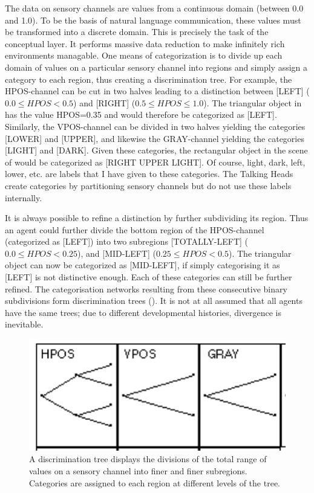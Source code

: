 The data on sensory channels are values from a continuous domain
(between 0.0 and 1.0). 
To be the basis of natural language communication, these
values must be transformed into a discrete domain. This is 
precisely the task of the conceptual layer. It 
performs massive data reduction to make infinitely
rich environments managable. One means of categorization
is to divide up each domain of values on a particular
sensory channel into regions and 
simply assign a category to each region, thus creating a 
discrimination tree. For example, 
the HPOS-channel can be cut in two halves leading to a 
distinction between [LEFT] ($0.0 \leq HPOS < 0.5$) and [RIGHT] 
($0.5 \leq HPOS \leq 1.0$). The triangular object 
in  has the value HPOS=0.35 
and would therefore be categorized as [LEFT]. Similarly, the 
VPOS-channel can be divided in two halves yielding the 
categories [LOWER] and [UPPER], and likewise the GRAY-channel
yielding the categories [LIGHT] and [DARK]. 
Given these categories, 
the rectangular object in the scene of 
 would be categorized as [RIGHT UPPER LIGHT].
Of course, light, dark, left, lower, etc. are labels 
that I have given to these categories. The Talking Heads 
create categories by partitioning sensory channels but do
not use these labels internally. 

It is always possible to refine a distinction by further
subdividing its region. Thus an agent could further divide the 
bottom region of the HPOS-channel (categorized as 
[LEFT]) into two subregions [TOTALLY-LEFT] ($0.0 \le HPOS < 0.25$), 
and [MID-LEFT] ($0.25 \le HPOS < 0.5$). The triangular object
can now be categorized as [MID-LEFT], if simply categorising it
as [LEFT] is not distinctive enough. Each of these categories can 
still be further refined. The categorisation networks
resulting from these consecutive binary subdivisions form
discrimination trees (). It is not at
all assumed that all agents have the same trees; due to 
different developmental histories, divergence is inevitable. 
\begin{figure}[htbp]
  \centerline{\includegraphics[width=.35\textwidth]{chap2/figs/tree1}}
\caption{\label{tree1} A discrimination tree displays
the divisions of the total range of 
values on a sensory channel into finer and finer subregions. 
Categories are assigned to each region at different 
levels of the tree.}
\end{figure}

